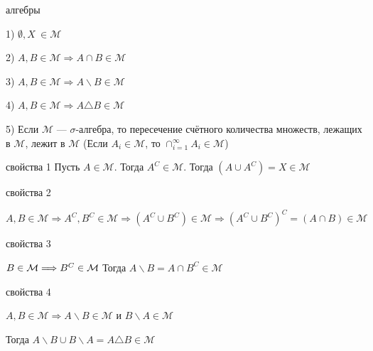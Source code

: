 \documentclass[12pt,a4paper]{article}
\begin{document}
\begin{props}{алгебры}

    1) $\emptyset, X\ \in \mathcal{M}$


    2) $A, B \in \mathcal{M} \Longrightarrow A \cap B \in \mathcal{M}$


    3) $A, B \in \mathcal{M} \Longrightarrow A \backslash B \in \mathcal{M}$


    4) $A, B \in \mathcal{M} \Longrightarrow A \triangle B \in \mathcal{M}$


    5) Если $\mathcal{M}$ — $\sigma$-алгебра, то пересечение счётного количества множеств, лежащих в $\mathcal{M}$, лежит в $\mathcal{M}$
    (Если $A_i \in \mathcal{M}$, то $\cap_{i=1}^{\infty} A_i \in \mathcal{M}$)

\end{props}

\begin{proofbox}{свойства 1}
    Пусть $A \in \mathcal{M}$. Тогда $A^C \in \mathcal{M}$. Тогда $(A \cup A^C) = X \in \mathcal{M}$
\end{proofbox}

\begin{proofbox}{свойства 2}

    \[
        A, B \in \mathcal{M} \Longrightarrow A^C, B^C \in \mathcal{M} \Longrightarrow (A^C \cup B^C) \in \mathcal{M} \Longrightarrow (A^C \cup B^C)^C = (A \cap B) \in \mathcal{M}
    \]

\end{proofbox}

\begin{proofbox}{свойства 3}

    $B \in \mathcal{M} \Longrightarrow B^C \in \mathcal{M} \\$
    Тогда $A \backslash B = A \cap B^C \in \mathcal{M}$

\end{proofbox}


\begin{proofbox}{свойства 4}

    $A, B \in \mathcal{M} \Longrightarrow A \backslash B \in \mathcal{M}$ и $B \backslash A \in \mathcal{M}$

    Тогда $A \backslash B \cup B \backslash A = A \triangle B \in \mathcal{M}$

\end{proofbox}
\end{document}

